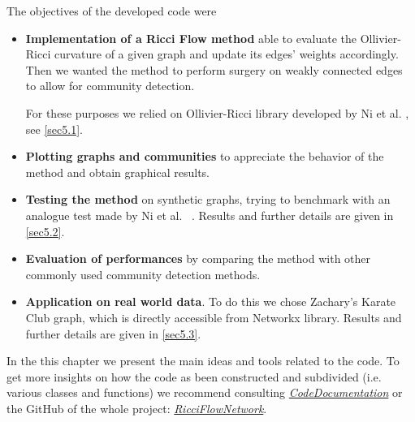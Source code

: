 The objectives of the developed code were
\begin{itemize}
    \item \textbf{Implementation of a Ricci Flow method} able to evaluate the Ollivier-Ricci curvature of a given graph and update its edges' weights accordingly. Then we wanted the method to perform surgery on weakly connected edges to allow for community detection.
    
    For these purposes we relied on Ollivier-Ricci library developed by Ni et al. \cite{Ollivier-RicciLib}, see \autoref{sec5.1}.
    
    \item \textbf{Plotting graphs and communities} to appreciate the behavior of the method and obtain graphical results.
    
    \item \textbf{Testing the method} on synthetic graphs, trying to benchmark with an analogue test made by Ni et al. ~\cite{Ni:communitydetectionnetworksricci}. Results and further details are given in \autoref{sec5.2}.
    
    \item \textbf{Evaluation of performances} by comparing the method with other commonly used community detection methods.  
    
    \item \textbf{Application on real world data}. To do this we chose Zachary's Karate Club graph, which is directly accessible from Networkx library. Results and further details are given in \autoref{sec5.3}.
    
\end{itemize}

In the this chapter we present the main ideas and tools related to the code. To get more insights on how the code as been constructed and subdivided (i.e. various classes and functions) we recommend consulting \textit{\href{https://fabbri-lorenzo.github.io/RicciFlowNetwork/}{CodeDocumentation}} or the GitHub of the whole project: \textit{\href{https://github.com/fabbri-lorenzo/RicciFlowNetwork}{RicciFlowNetwork}}.